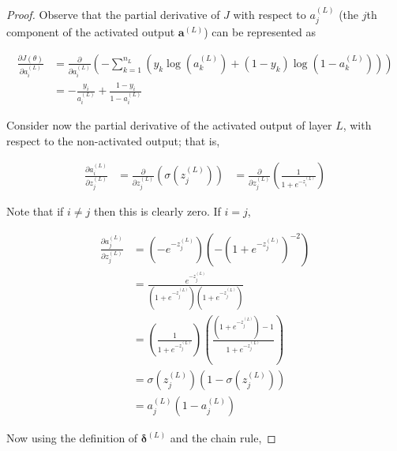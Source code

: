 \documentclass{article}[11pt]
\begin{document}
        
        \begin{proof}
            
            Observe that the partial derivative of $J$ with respect to $a^{(L)}_j$ (the $j$th component of the activated output $\mathbf{a}^{(L)}$) can be represented as
                    
            $$ \begin{aligned}
            \frac{\partial J(\theta)}{\partial a^{(L)}_i}
            &= \frac{\partial}{\partial a^{(L)}_i} \left( - \sum_{k=1}^{n_L} \left( y_k \log(a^{(L)}_k) + (1 - y_k) \log(1 - a^{(L)}_k) \right) \right) \\
            &= - \frac{y_i}{a^{(L)}_i} + \frac{1 - y_i}{1 - a^{(L)}_i}
            \end{aligned} $$
            
            Consider now the partial derivative of the activated output of layer $L$, with respect to the non-activated output; that is,
            
            $$ \begin{aligned}
            \frac{\partial a^{(L)}_i}{\partial z^{(L)}_j}
            &= \frac{\partial}{\partial z^{(L)}_j} \left( \sigma(z^{(L)}_j) \right)
            &= \frac{\partial}{\partial z^{(L)}_j} \left( \frac{1}{1 + e^{-z^{(L)}_i}} \right)
            \end{aligned} $$
                
            Note that if $i \neq j$ then this is clearly zero. If $i = j$,
            
            $$ \begin{aligned}
            \frac{\partial a^{(L)}_j}{\partial z^{(L)}_j}
            &= \left( - e^{-z^{(L)}_j} \right) \left( - \left( 1 + e^{-z^{(L)}_j} \right)^{-2} \right) \\
            &= \frac{e^{-z^{(L)}_j}}{\left( 1 + e^{-z^{(L)}_j} \right) \left( 1 + e^{-z^{(L)}_j} \right)} \\
            &= \left( \frac{1}{1 + e^{-z^{(L)}_j}} \right) \left( \frac{\left( 1 + e^{-z^{(L)}_j} \right) - 1}{1 + e^{-z^{(L)}_j}} \right) \\
            &= \sigma(z^{(L)}_j) \left( 1 - \sigma(z^{(L)}_j) \right) \\
            &= a^{(L)}_j \left( 1 - a^{(L)}_j \right)
            \end{aligned} $$
            
            Now using the definition of $\boldsymbol{\delta}^{(L)}$ and the chain rule,
            

\end{proof}
\end{document}
